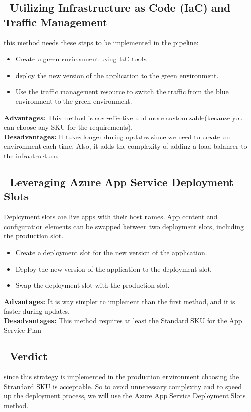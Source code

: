 \subsection*{ \textbullet\ Utilizing Infrastructure as Code (IaC) and Traffic Management}
this method needs these steps to be implemented in the pipeline:
\begin{itemize}
    \item Create a green environment using IaC tools.
    \item deploy the new version of the application to the green environment.
    \item Use the traffic management resource to switch the traffic from the blue environment to the green environment.
\end{itemize}
\textbf{Advantages:} This method is cost-effective and more customizable(because you can choose any SKU for the requirements).
\\
\textbf{Desadvantages:} It takes longer during updates since we need to create an environment each time. Also, it adds the complexity of adding a load balancer to the infrastructure.
\subsection*{ \textbullet\ Leveraging Azure App Service Deployment Slots}
Deployment slots are live apps with their host names. App content and configuration elements can be swapped between two deployment slots, including the production slot.
\begin{itemize}
    \item Create a deployment slot for the new version of the application.
    \item Deploy the new version of the application to the deployment slot.
    \item Swap the deployment slot with the production slot.
\end{itemize}
\textbf{Advantages:} It is way simpler to implement than the first method, and it is faster during updates.
\\
\textbf{Desadvantages:} This method requires at least the Standard SKU for the App Service Plan.
\subsection*{ \textbullet\ Verdict}
since this strategy is implemented in the production environment choosing the Strandard SKU is acceptable. So to avoid unnecessary complexity and to speed up the deployment process, we will use the Azure App Service Deployment Slots method.
\\

